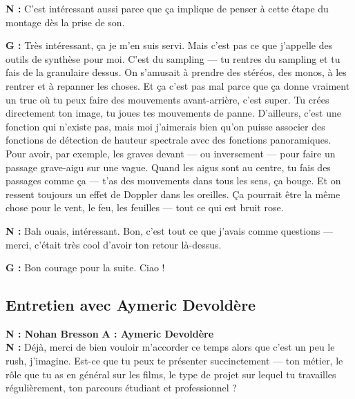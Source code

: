﻿\documentclass[12pt]{article}
\begin{document}
\textbf{N :} C'est intéressant aussi parce que ça implique de penser à cette étape du montage dès la prise de son.

\textbf{G :} Très intéressant, ça je m'en suis servi. Mais c'est pas ce que j'appelle des outils de synthèse pour moi. C'est du sampling — tu rentres du sampling et tu fais de la granulaire dessus. On s'amusait à prendre des stéréos, des monos, à les rentrer et à repanner les choses. Et ça c'est pas mal parce que ça donne vraiment un truc où tu peux faire des mouvements avant-arrière, c'est super. Tu crées directement ton image, tu joues tes mouvements de panne. D'ailleurs, c'est une fonction qui n'existe pas, mais moi j'aimerais bien qu'on puisse associer des fonctions de détection de hauteur spectrale avec des fonctions panoramiques. Pour avoir, par exemple, les graves devant — ou inversement — pour faire un passage grave-aigu sur une vague. Quand les aigus sont au centre, tu fais des passages comme ça — t'as des mouvements dans tous les sens, ça bouge. Et on ressent toujours un effet de Doppler dans les oreilles. Ça pourrait être la même chose pour le vent, le feu, les feuilles — tout ce qui est bruit rose.

\textbf{N :} Bah ouais, intéressant. Bon, c'est tout ce que j'avais comme questions — merci, c'était très cool d'avoir ton retour là-dessus.


\textbf{G :} Bon courage pour la suite. Ciao !

\subsection{Entretien avec Aymeric Devoldère}
\setlength{\parindent}{0pt}
\textbf{N : Nohan Bresson 
} 
\textbf{A : Aymeric Devoldère}  
\\

\textbf{N :} Déjà, merci de bien vouloir m'accorder ce temps alors que c'est un peu le rush, j'imagine. Est-ce que tu peux te présenter succinctement — ton métier, le rôle que tu as en général sur les films, le type de projet sur lequel tu travailles régulièrement, ton parcours étudiant et professionnel ?
\end{document}
